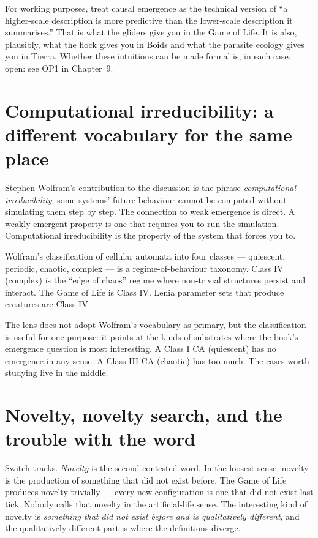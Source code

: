 For working purposes, treat causal emergence as the technical version
of ``a higher-scale description is more predictive than the lower-scale
description it summarises.'' That is what the gliders give you in the
Game of Life. It is also, plausibly, what the flock gives you in Boids
and what the parasite ecology gives you in Tierra. Whether these
intuitions can be made formal is, in each case, open: see OP1 in
Chapter~9.

\section{Computational irreducibility: a different vocabulary for the same place}

Stephen Wolfram's contribution to the discussion is the phrase
\emph{computational irreducibility}: some systems' future behaviour
cannot be computed without simulating them step by step. The connection
to weak emergence is direct. A weakly emergent property is one that
requires you to run the simulation. Computational irreducibility is the
property of the system that forces you to.

Wolfram's classification of cellular automata into four classes ---
quiescent, periodic, chaotic, complex --- is a regime-of-behaviour
taxonomy. Class IV (complex) is the ``edge of chaos'' regime where
non-trivial structures persist and interact. The Game of Life is Class
IV. Lenia parameter sets that produce creatures are Class IV.

The lens does not adopt Wolfram's vocabulary as primary, but the
classification is useful for one purpose: it points at the kinds of
substrates where the book's emergence question is most interesting. A
Class I CA (quiescent) has no emergence in any sense. A Class III CA
(chaotic) has too much. The cases worth studying live in the middle.

\section{Novelty, novelty search, and the trouble with the word}

Switch tracks. \emph{Novelty} is the second contested word. In the
loosest sense, novelty is the production of something that did not
exist before. The Game of Life produces novelty trivially --- every new
configuration is one that did not exist last tick. Nobody calls that
novelty in the artificial-life sense. The interesting kind of novelty is
\emph{something that did not exist before and is qualitatively
different}, and the qualitatively-different part is where the
definitions diverge.

